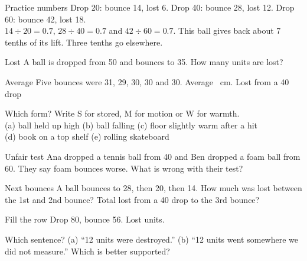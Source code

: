 \begin{worked}{Practice numbers}
Drop 20: bounce 14, lost 6. Drop 40: bounce 28, lost 12. Drop 60: bounce 42, lost 18.\\
$14\div20=0.7$, $28\div40=0.7$ and $42\div60=0.7$. This ball gives back about 7 tenths of its lift. Three tenths go elsewhere.
\end{worked}

\clearpage

\begin{puzzle}{Lost}
A ball is dropped from 50 and bounces to 35. How many units are lost? \wline[1.6cm]
\end{puzzle}

\begin{puzzle}{Average}
Five bounces were 31, 29, 30, 30 and 30. Average \wline[1.6cm]~cm. Lost from a 40 drop \wline[1.6cm]
\end{puzzle}

\begin{puzzle}{Which form?}
Write S for stored, M for motion or W for warmth.\\
(a) ball held up high \wline[1cm] \quad (b) ball falling \wline[1cm] \quad (c) floor slightly warm after a hit \wline[1cm]\\
(d) book on a top shelf \wline[1cm] \quad (e) rolling skateboard \wline[1cm]
\end{puzzle}

\begin{puzzle}{Unfair test}
Ana dropped a tennis ball from 40 and Ben dropped a foam ball from 60. They say foam bounces worse. What is wrong with their test? \wline[6cm]
\end{puzzle}

\begin{puzzle}{Next bounces}
A ball bounces to 28, then 20, then 14. How much was lost between the 1st and 2nd bounce? \wline[1.6cm] Total lost from a 40 drop to the 3rd bounce? \wline[1.6cm]
\end{puzzle}

\clearpage

\begin{puzzle}{Fill the row}
Drop 80, bounce 56. Lost \wline[1.6cm] units.
\end{puzzle}

\begin{puzzle}{Which sentence?}
(a) ``12 units were destroyed.'' (b) ``12 units went somewhere we did not measure.'' Which is better supported? \wline[1.6cm]
\end{puzzle}

